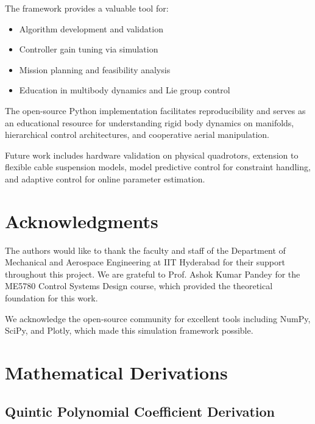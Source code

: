 \documentclass[12pt,a4paper]{article}
\begin{document}
The framework provides a valuable tool for:
\begin{itemize}
    \item Algorithm development and validation
    \item Controller gain tuning via simulation
    \item Mission planning and feasibility analysis
    \item Education in multibody dynamics and Lie group control
\end{itemize}

The open-source Python implementation facilitates reproducibility and serves as an educational resource for understanding rigid body dynamics on manifolds, hierarchical control architectures, and cooperative aerial manipulation.

Future work includes hardware validation on physical quadrotors, extension to flexible cable suspension models, model predictive control for constraint handling, and adaptive control for online parameter estimation.

\section*{Acknowledgments}

The authors would like to thank the faculty and staff of the Department of Mechanical and Aerospace Engineering at IIT Hyderabad for their support throughout this project. We are grateful to Prof. Ashok Kumar Pandey for the ME5780 Control Systems Design course, which provided the theoretical foundation for this work.

We acknowledge the open-source community for excellent tools including NumPy, SciPy, and Plotly, which made this simulation framework possible.


\newpage
\appendix

\section{Mathematical Derivations}
\label{app:derivations}

\subsection{Quintic Polynomial Coefficient Derivation}
\end{document}
